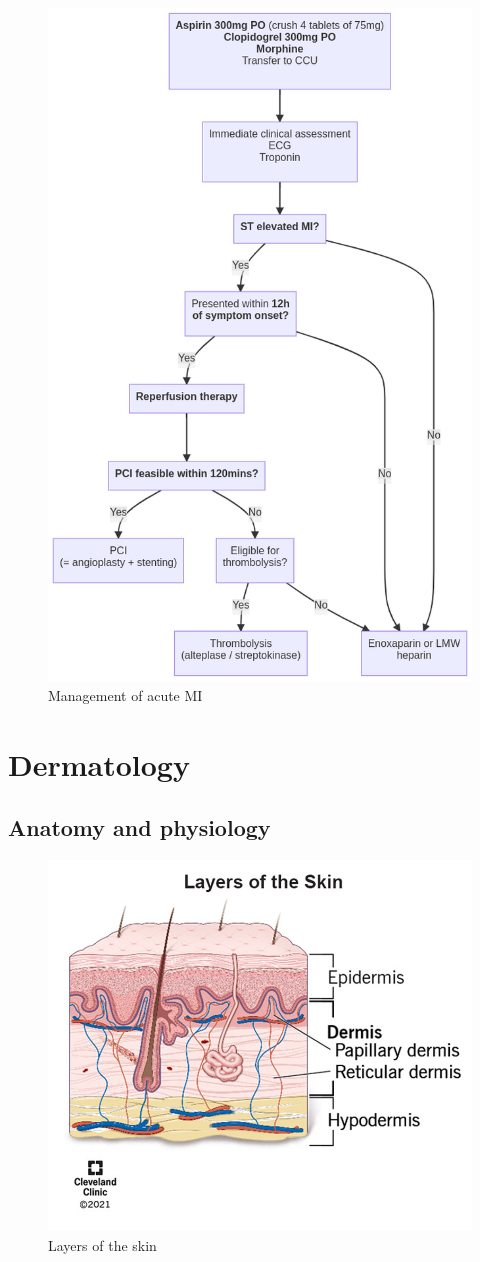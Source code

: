 \documentclass[
  12pt,
]{memoir}
\begin{document}
\begin{figure}
\centering
\includegraphics[width=.65\textwidth]{../assets/med/MI-mx.png}
\vspace{5mm}
\caption{Management of acute MI}
\end{figure}

\pagebreak

\hypertarget{dermatology}{%
\chapter{Dermatology}\label{dermatology}}

\hypertarget{anatomy-and-physiology-1}{%
\section{Anatomy and physiology}\label{anatomy-and-physiology-1}}

\begin{figure}
    \centering
    \includegraphics[width=.5\textwidth]{../assets/surg/skin-layers.jpg}
    \caption{Layers of the skin}
\end{figure}
\end{document}
